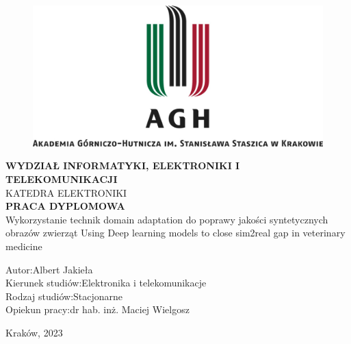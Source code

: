 \begin{titlepage}
            
    \begin{center}
            \vspace{24.5pt}
            
            \begin{figure}[h!]
                \center
                \includegraphics[width=14cm]{src/title_page/loga/agh_logo.png}
            \end{figure}
            
            \vspace{13.5pt}
            \textbf{WYDZIAŁ INFORMATYKI, ELEKTRONIKI I TELEKOMUNIKACJI}\\
            \small{KATEDRA ELEKTRONIKI}\\
            \vspace{54pt}
            \large{\textbf{PRACA DYPLOMOWA}}\\
            \vspace{13.5pt}
            \large{Wykorzystanie technik domain adaptation do poprawy jakości syntetycznych obrazów zwierząt}
            \linebreak
            Using Deep learning models to close sim2real gap in veterinary medicine
            \vspace{5cm}
            
        \begin{flushleft}
            Autor:\hspace{3.4cm}Albert Jakieła\\
            Kierunek studiów:\hspace{1cm}Elektronika i telekomunikacje\\
            Rodzaj studiów:\hspace{1.5cm}Stacjonarne\\
            Opiekun pracy:\hspace{1.6cm}dr hab. inż. Maciej Wielgosz\\
        \end{flushleft}
        
        \vspace{0.5cm}
        Kraków, 2023
        
    \end{center}

\end{titlepage}
